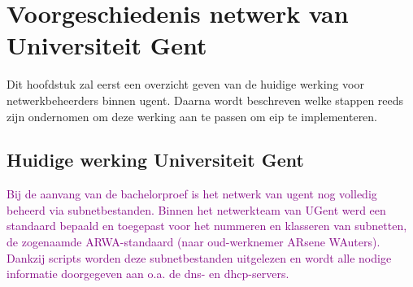 
\chapter{Voorgeschiedenis netwerk van Universiteit Gent}%
\label{ch:voorgeschiedenis}

Dit hoofdstuk zal eerst een overzicht geven van de huidige werking voor netwerkbeheerders binnen \acrshort{ugent}.
Daarna wordt beschreven welke stappen reeds zijn ondernomen om deze werking aan te passen om \acrlong{eip} te implementeren.

\section{Huidige werking Universiteit Gent}
\textcolor{purple}{Bij de aanvang van de bachelorproef is het netwerk van \acrshort{ugent} nog volledig beheerd via subnetbestanden. Binnen het netwerkteam van UGent werd een standaard bepaald en toegepast voor het nummeren en klasseren van subnetten, de zogenaamde ARWA-standaard (naar oud-werknemer ARsene WAuters). Dankzij scripts worden deze subnetbestanden uitgelezen en wordt alle nodige informatie doorgegeven aan o.a. de \acrshort{dns}- en \acrshort{dhcp}-servers.}

